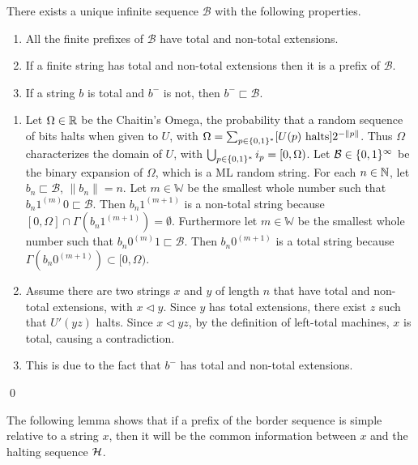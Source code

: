 \documentclass[11pt]{article}\textwidth 6.5in\textheight 9in
\begin{document}
\begin{prp}
\label{prp:unique}
	There exists a unique infinite sequence $\mathcal{B}$ with the following properties. 
	\begin{enumerate}
		\item All the finite prefixes of $\mathcal{B}$ have total and non-total extensions. 
		\item If a finite string has total and non-total extensions then it is a prefix of $\mathcal{B}$.
		\item  If a string $b$ is total and $b^-$ is not, then $b^-\sqsubset\mathcal{B}$.
	\end{enumerate}
\end{prp}
\begin{prf}
\begin{enumerate}
\item Let $\Omega\in\mathbb{R}$ be the Chaitin's Omega, the probability that a random sequence of bits halts when given to $U$, with $\Omega =\sum_{p\in\{0,1\}^*}[U(p)\textrm{ halts}]2^{-\|p\|}$.  Thus $\Omega$ characterizes the domain of $U$, with $\bigcup_{p\in\{0,1\}^*}i_p=[0,\Omega)$. Let $\mathcal{B}\in \{0,1\}^\infty$ be the binary expansion of $\Omega$, which is a ML random string. For each  $n\in \mathbb{N}$, let $b_n\sqsubset\mathcal{B}$, $\|b_n\|=n$. Let $m\in\mathbb{W}$ be the smallest whole number such that $b_n1^{(m)}0\sqsubset\mathcal{B}$. Then $b_n1^{(m+1)}$ is a non-total string because $[0,\Omega]\cap\Gamma(b_n1^{(m+1)})=\emptyset$. Furthermore let $m\in\mathbb{W}$ be the smallest whole number such that $b_n0^{(m)}1\sqsubset\mathcal{B}$. Then $b_n0^{(m+1)}$ is a total string because $\Gamma(b_n0^{(m+1)})\subset[0,\Omega)$.
\item Assume there are two strings $x$ and $y$ of length $n$ that have total and non-total extensions, with $x\lhd y$. Since $y$ has total extensions, there exist $z$ such that $U'(yz)$ halts. Since $x\lhd yz$, by the definition of left-total machines, $x$ is total, causing a contradiction.
\item This is due to the fact that $b^-$ has total and non-total extensions.
\end{enumerate}
 \qed\\
\end{prf}

The following lemma shows that if a prefix of the border sequence is simple relative to a string $x$, then it will be the common information between $x$ and the halting sequence ${\mathcal H}$.
\end{document}
